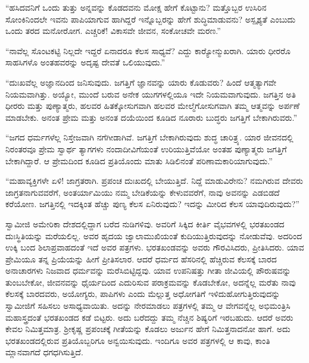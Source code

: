  “ಹಸಿದವನಿಗೆ ಒಂದು ತುತ್ತು ಅನ್ನವನ್ನು ಕೊಡದವನು ಮೋಕ್ಷ ಹೇಗೆ ಕೊಟ್ಟಾನು? ಮತ್ತೊಬ್ಬರ ಉಸಿರಿನ ಸೋಂಕಿನಿಂದಲೇ ಇವನು ಪಾಪಿಯಾಗುವ ಹಾಗಿದ್ದರೆ ಇನ್ನೊಬ್ಬರನ್ನು ಹೇಗೆ ಶುದ್ಧಿಮಾಡುವನು? ಅಸ್ಪೃಶ್ಯತೆ ಎಂಬುದು ಒಂದು ತರದ ಮನೋರೋಗ. ಎಚ್ಚರಿಕೆ! ವಿಕಾಸವೇ ಜೀವನ, ಸಂಕೋಚವೇ ಮರಣ.” 

 “ನಾವೆಲ್ಲ ಸೊಂಟಕಟ್ಟಿ ನಿಲ್ಲದೇ ಇದ್ದರೆ ಏನಾದರೂ ಕೆಲಸ ಸಾಧ್ಯವೆ? ಎದ್ದು ಕಾರ‍್ಯೋನ್ಮುಖರಾಗಿ. ಯಾರು ಧೀರರೊ ಸಾಹಸಿಗಳೊ ಅಂತಹವರನ್ನು ಅದೃಷ್ಟ ದೇವತೆ ಒಲಿಯುವುದು.” 

 “ದುಃಖವೆಲ್ಲ ಅಜ್ಞಾನದಿಂದ ಜನಿಸುವುದು. ಜಗತ್ತಿಗೆ ಜ್ಞಾನವನ್ನು ಯಾರು ಕೊಡುವರು? ಹಿಂದೆ ಆತ್ಮತ್ಯಾಗವೇ ನಿಯಮವಾಗಿತ್ತು. ಅಯ್ಯೋ, ಮುಂದೆ ಬರುವ ಅನೇಕ ಯುಗಗಳಲ್ಲಿಯೂ ಇದೇ ನಿಯಮವಾಗುವುದು. ಜಗತ್ತಿನ ಅತಿ ಧೀರರು ಮತ್ತು ಪುಣ್ಯಾತ್ಮರು, ಹಲವರ ಹಿತಕ್ಕೋಸುಗವಾಗಿ ಹಲವರ ಮೇಲ್ಮೆಗೋಸುಗವಾಗಿ ತಮ್ಮ ಆತ್ಮವನ್ನು ಅರ್ಪಣೆ ಮಾಡಬೇಕು. ಅನಂತ ಪ್ರೇಮ ಮತ್ತು ಅನಂತ ದಯೆಯಿಂದ ಕೂಡಿದ ನೂರಾರು ಬುದ್ಧರು ಜಗತ್ತಿಗೆ ಬೇಕಾಗಿರುವರು.” 

 “ಜಗದ ಧರ್ಮಗಳೆಲ್ಲ ನಿಸ್ತೇಜವಾಗಿ ನಗೆಗೀಡಾಗಿವೆ. ಜಗತ್ತಿಗೆ ಬೇಕಾಗಿರುವುದು ಶುದ್ಧ ಚಾರಿತ್ರ್ಯ. ಯಾರ ಜೀವನದಲ್ಲಿ ನಿರಂತರವೂ ಪ್ರೇಮ ಸ್ವಾರ್ಥ ತ್ಯಾಗಗಳು ನಂದಾದೀವಿಗೆಯಂತೆ ಉರಿಯುತ್ತಿವೆಯೋ ಅಂತಹ ಪುಣ್ಯಾತ್ಮರು ಜಗತ್ತಿಗೆ ಬೇಕಾಗಿದ್ದಾರೆ. ಆ ಪ್ರೇಮದಿಂದ ಕೂಡಿದ ಪ್ರತಿಯೊಂದು ಮಾತು ಸಿಡಿಲಿನಂತೆ ಪರಿಣಾಮಕಾರಿಯಾಗುವುದು.” 

 “ಮಹಾವ್ಯಕ್ತಿಗಳೇ ಏಳಿ! ಜಾಗ್ರತರಾಗಿ. ಪ್ರಪಂಚ ದುಃಖದಲ್ಲಿ ಬೇಯುತ್ತಿದೆ. ನಿದ್ದೆ ಮಾಡುವಿರೇನು? ನಮಗಿರುವ ದೇವರು ಜಾಗ್ರತನಾಗುವವರೆಗೆ, ಅಂತರ್ಯಾಮಿಯು ನಮ್ಮ ಬೇಡಿಕೆಯನ್ನು ಕೇಳುವವರೆಗೆ, ನಾವು ಅವನನ್ನು ಎಡಬಿಡದೆ ಕರೆಯೋಣ. ಜಗತ್ತಿನಲ್ಲಿ ಇದಕ್ಕಿಂತ ಹೆಚ್ಚು ಪುಣ್ಯ ಕೆಲಸ ಏನಿರುವುದು? ಇದನ್ನು ಮೀರಿದ ಕೆಲಸ ಯಾವುದಿರುವುದು?” 

 ಸ್ವಾಮೀಜಿ ಅಮೇರಿಕಾ ದೇಶದಲ್ಲಿದ್ದಾಗ ಬರೆದ ನುಡಿಗಳಿವು. ಅವರಿಗೆ ಸಿಕ್ಕಿದ ಕೀರ್ತಿ ವೈಭವಗಳಲ್ಲಿ ಭರತಖಂಡದ ದುಃಸ್ಥಿತಿಯನ್ನು ಮರೆಯಲಿಲ್ಲ. ಅವರ ಹೃದಯ ಜ್ವಾಲಾಮುಖಿಯಂತೆ ಕುದಿಯುತ್ತಿರುವುದನ್ನು ನೋಡುವೆವು. ಅದರಿಂದ ಉಕ್ಕಿ ಬಂದ ಶಿಲಾಪ್ರವಾಹದಂತೆ ಇದೆ ಅವರ ಪತ್ರಗಳು. ಭರತಖಂಡವನ್ನು ಅವರು ಗೌರವಿಸಿದರು, ಪ್ರೀತಿಸಿದರು. ಯಾವ ಪ್ರೇಮಿಯೂ ತನ್ನ ಪ್ರಿಯೆಯನ್ನು ಹೀಗೆ ಪ್ರೀತಿಸಲಾರ. ಆದರೆ ಧರ್ಮದ ಹೆಸರಿನಲ್ಲಿ ಹೆಚ್ಚಿರುವ ಕೆಲಸಕ್ಕೆ ಬಾರದ ಅನಾಚಾರಗಳು ನಿಜವಾದ ಧರ್ಮವನ್ನು ಮರೆಸಿಬಿಟ್ಟಿದ್ದವು. ಯಾವ ಉಪನಿಷತ್ತು ಗೀತಾ ಜೀವಿಯಲ್ಲಿ ಪೌರುಷವನ್ನು ತುಂಬಬೇಕೋ, ಜೀವನವನ್ನು ಧೈರ್ಯದಿಂದ ಎದುರಿಸುವ ಪರಾಕ್ರಮವನ್ನು ಕೊಡಬೇಕೋ, ಅದನ್ನೆಲ್ಲ ಮರೆತು ನಾವು ಕೆಲಸಕ್ಕೆ ಬಾರದವರು, ಅಯೋಗ್ಯರು, ಪಾಪಿಗಳು ಎಂದು ಮೆಲ್ಲುತ್ತ ಅಧೋಗತಿಗೆ ಇಳಿದುಹೋಗುತ್ತಿರುವುದನ್ನು ಸ್ವಾಮೀಜಿಗೆ ಸಹಿಸಲು ಅಸಾಧ್ಯವಾಯಿತು. ಅದನ್ನು ನೇರಮಾಡಲು ಪತ್ರಗಳಲ್ಲಿ ತಮ್ಮ ಆ ವೇಗವನ್ನೆಲ್ಲ ಅಭಿಮಂತ್ರಿಸಿ ಮಹಾಸ್ತ್ರದಂತೆ ಭರತಖಂಡದ ಕಡೆ ಬಿಟ್ಟರು. ಅದು ಬರೆದದ್ದು ತಮ್ಮ ನೆಚ್ಚಿನ ಶಿಷ್ಯರಿಗೆ ಇರಬಹುದು. ಆದರೆ ಅವರು ಕೇವಲ ನಿಮಿತ್ತಮಾತ್ರ. ಶ‍್ರೀಕೃಷ್ಣ ಪ್ರಪಂಚಕ್ಕೆ ಗೀತೆಯನ್ನು ಕೊಡಲು ಅರ್ಜುನ ಹೇಗೆ ನಿಮಿತ್ತನಾದನೋ ಹಾಗೆ. ಅದು ಭರತಖಂಡದಲ್ಲಿರುವ ಪ್ರತಿಯೊಬ್ಬರಿಗೂ ಅನ್ವಯಿಸುವುದು. ಇಂದಿಗೂ ಅವರ ಪತ್ರಗಳಲ್ಲಿ ಆ ಕಾವು, ಕಾಂತಿ ಮ್ಲಾನವಾಗದೆ ಧಗಧಗಿಸುತ್ತಿದೆ. 

